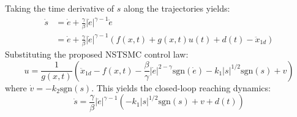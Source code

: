 Taking the time derivative of $s$ along the trajectories yields:
\begin{align}
\dot{s} &= \dot{e} + \frac{\gamma}{\beta} |\dot{e}|^{\gamma - 1} \ddot{e} \\
&= \dot{e} + \frac{\gamma}{\beta} |\dot{e}|^{\gamma - 1} (f(x,t) + g(x,t)u(t) + d(t) - \ddot{x}_{1d})
\end{align}
Substituting the proposed NSTSMC control law:
\begin{equation}
u = \frac{1}{g(x,t)} \left( \ddot{x}_{1d} - f(x,t) - \frac{\beta}{\gamma} |\dot{e}|^{2 - \gamma} \text{sgn}(\dot{e}) - k_1 |s|^{1/2} \text{sgn}(s) + v \right)
\end{equation}
where $\dot{v} = -k_2 \text{sgn}(s)$. This yields the closed-loop reaching dynamics:
\begin{equation}
\dot{s} = \frac{\gamma}{\beta} |\dot{e}|^{\gamma - 1} \left( -k_1 |s|^{1/2} \text{sgn}(s) + v + d(t) \right)
\end{equation}

